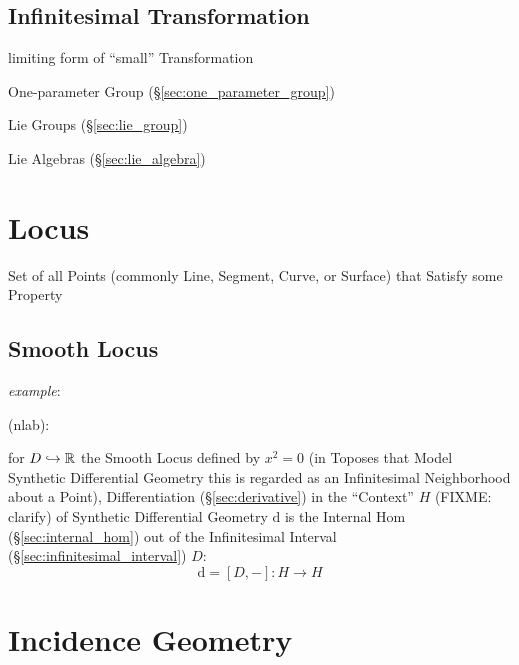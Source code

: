 \subsection{Infinitesimal Transformation}
\label{sec:infinitesimal_transformation}

limiting form of ``small'' Transformation

One-parameter Group (\S\ref{sec:one_parameter_group})

Lie Groups (\S\ref{sec:lie_group})

Lie Algebras (\S\ref{sec:lie_algebra})



\section{Locus}\label{sec:locus}


Set of all Points (commonly Line, Segment, Curve, or Surface) that Satisfy some
Property




\subsection{Smooth Locus}\label{sec:smooth_locus}

\emph{example}:

(nlab):

for $D \hookrightarrow \mathbb{R}$ the Smooth Locus defined by $x^2 = 0$ (in Toposes
that Model Synthetic Differential Geometry this is regarded as an Infinitesimal
Neighborhood about a Point), Differentiation (\S\ref{sec:derivative}) in the
``Context'' $H$ (FIXME: clarify) of Synthetic Differential Geometry $\mathrm{d}$
is the Internal Hom (\S\ref{sec:internal_hom}) out of the Infinitesimal Interval
(\S\ref{sec:infinitesimal_interval}) $D$:
\[
  \mathrm{d} = [D,-] : H \rightarrow H
\]



\section{Incidence Geometry}\label{sec:incidence_geometry}

